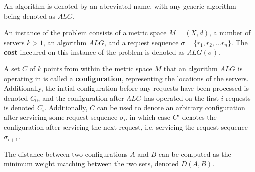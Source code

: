 \begin{definition}
    An algorithm is denoted by an abreviated name, with any generic algorithm being denoted as $ALG$.
\end{definition}

\begin{definition}
    An instance of the \KS problem consists of a metric space $M = (X,d)$, a number of servers $k >1$, an algorithm $ALG$, and a request sequence $\sigma = \{ r_1, r_2, ... r_n\}$. The \textbf{cost} inccured on this instance of the \KS problem is denoted as $ALG(\sigma)$.
\end{definition}

\begin{definition}
    A set $C$ of $k$ points from within the metric space $M$ that an algorithm $ALG$ is operating in is called a \textbf{configuration}, representing the locations of the servers. Additionally, the initial configuration before any requests have been processed is denoted $C_0$, and the configuration after $ALG$ has operated on the first $i$ requests is denoted $C_{i}$. Additionally, $C$ can be used to denote an arbitrary configuration after servicing some request sequence $\sigma_i$, in which case $C'$ denotes the configuration after servicing the next request, i.e. servicing the request sequence $\sigma_{i+1}$.
\end{definition}

\begin{definition}
    The distance between two configurations $A$ and $B$ can be computed as the minimum weight matching between the two sets, denoted $D(A, B)$.
\end{definition}

